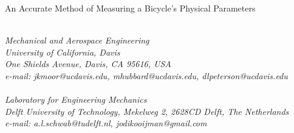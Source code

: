 \documentclass{bmd2010a}
\begin{document}
\begin{flushleft}
{\fontsize{16pt}{20pt}\selectfont%
  An Accurate Method of Measuring a Bicycle's Physical Parameters\\}
\end{flushleft}

\begin{flushleft}
  {\\}
  \textit{Mechanical and Aerospace Engineering\\
          University of California, Davis\\
          One Shields Avenue, Davis, CA 95616, USA\\
          e-mail: jkmoor@ucdavis.edu, mhubbard@ucdavis.edu,
          dlpeterson@ucdavis.edu
  }\vspace{10pt}\\
  {\\}
  \textit{Laboratory for Engineering Mechanics\\
          Delft University of Technology, Mekelweg 2, 2628CD Delft, The
          Netherlands\\
          e-mail: a.l.schwab@tudelft.nl, jodikooijman@gmail.com
  }\vspace{10pt}\\
\end{flushleft}
\end{document}
